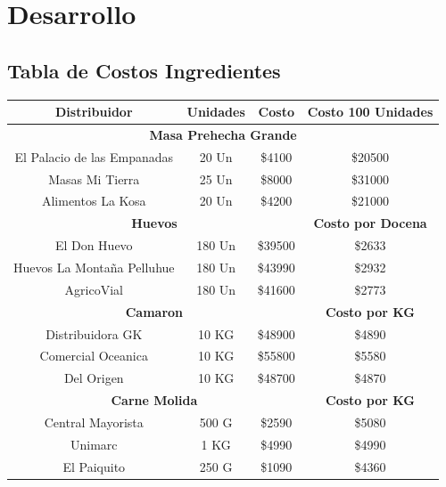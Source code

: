 \documentclass[12pt]{article}
\begin{document}
\section{Desarrollo} %
\subsection{}

\subsection{Tabla de Costos Ingredientes}

\begin{table}[h!]
    \centering
    \begin{tabular}{|| c | c | c | c||} 
        \hline
    \textbf{Distribuidor} & Unidades & \textbf{Costo} & \textbf{Costo 100 Unidades} \\ [0.5ex]
        \hline\hline
        \multicolumn{4}{||c||}{\textbf{Masa Prehecha Grande}} \\ [0.5ex] \hline \hline
        El Palacio de las Empanadas & 20 Un & \$4100 & \$20500 \\ \hline
        Masas Mi Tierra & 25 Un & \$8000 & \$31000 \\ \hline
        Alimentos La Kosa & 20 Un & \$4200 & \$21000 \\ [1ex] \hline \hline

        \multicolumn{3}{||c||}{\textbf{Huevos}} & \textbf{Costo por Docena} \\ [0.5ex] \hline \hline
        El Don Huevo & 180 Un & \$39500 & \$2633 \\ \hline
        Huevos La Montaña Pelluhue & 180 Un & \$43990 & \$2932 \\ \hline
        AgricoVial & 180 Un & \$41600 & \$2773 \\ [1ex] \hline \hline

        \multicolumn{3}{||c|}{\textbf{Camaron}} & \textbf{Costo por KG} \\ [0.5ex] \hline \hline
        Distribuidora GK & 10 KG & \$48900 & \$4890 \\ \hline
        Comercial Oceanica & 10 KG & \$55800 & \$5580 \\ \hline
        Del Origen & 10 KG & \$48700 & \$4870 \\ [1ex] \hline \hline

        \multicolumn{3}{||c|}{\textbf{Carne Molida}} & \textbf{Costo por KG} \\ [0.5ex] \hline \hline %
        Central Mayorista & 500 G & \$2590 & \$5080 \\ \hline 
        Unimarc & 1 KG & \$4990 & \$4990 \\ \hline 
        El Paiquito & 250 G & \$1090 & \$4360 \\ [1ex] \hline \hline



\end{tabular}
\end{table}
\end{document}
